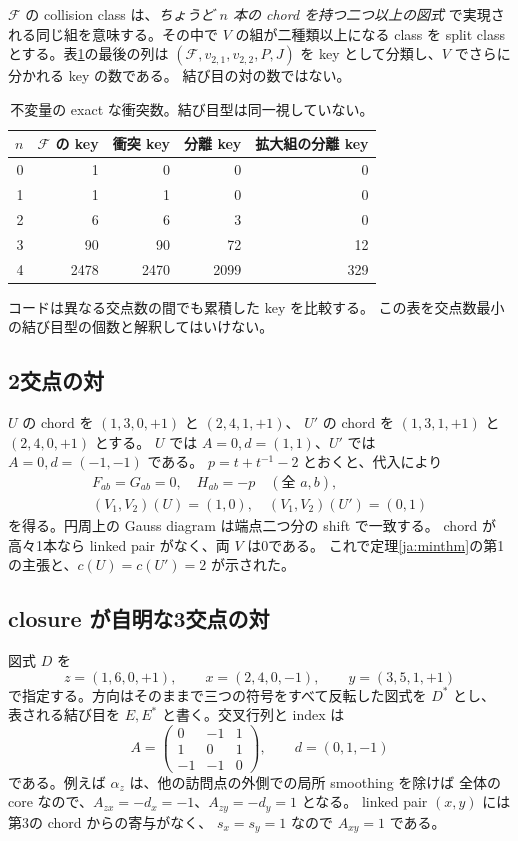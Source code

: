 \documentclass[12pt]{amsart}
\theoremstyle{definition}
\theoremstyle{remark}
\numberwithin{equation}{section}
\newcommand{\Package}{\mathcal F}
\begin{document}
$\Package$ の collision class は、\emph{ちょうど $n$ 本の chord を持つ二つ以上の図式}
で実現される同じ組を意味する。その中で $V$ の組が二種類以上になる class を
split class とする。表\ref{ja:collisions}の最後の列は
$(\Package,v_{2,1},v_{2,2},P,J)$ を key として分類し、$V$ でさらに分かれる key の数である。
結び目の対の数ではない。
\begin{table}[ht]
\centering\small
\caption{不変量の exact な衝突数。結び目型は同一視していない。}\label{ja:collisions}
\begin{tabular}{r r r r r}\toprule
$n$&$\Package$ の key&衝突 key&分離 key&拡大組の分離 key\\\midrule
0&1&0&0&0\\1&1&1&0&0\\2&6&6&3&0\\
3&90&90&72&12\\4&2478&2470&2099&329\\\bottomrule
\end{tabular}
\end{table}
コードは異なる交点数の間でも累積した key を比較する。
この表を交点数最小の結び目型の個数と解釈してはいけない。

\subsection{2交点の対}
$U$ の chord を $(1,3,0,+1)$ と $(2,4,1,+1)$、
$U'$ の chord を $(1,3,1,+1)$ と $(2,4,0,+1)$ とする。
$U$ では $A=0,d=(1,1)$、$U'$ では $A=0,d=(-1,-1)$ である。
$p=t+t^{-1}-2$ とおくと、代入により
\begin{equation}\label{ja:two}
\begin{gathered}
F_{ab}=G_{ab}=0,\quad H_{ab}=-p\quad(\text{全 }a,b),\\
(V_1,V_2)(U)=(1,0),\quad(V_1,V_2)(U')=(0,1)
\end{gathered}
\end{equation}
を得る。円周上の Gauss diagram は端点二つ分の shift で一致する。
chord が高々1本なら linked pair がなく、両 $V$ は0である。
これで定理\ref{ja:minthm}の第1の主張と、$c(U)=c(U')=2$ が示された。

\subsection{closure が自明な3交点の対}
図式 $D$ を
\begin{equation}\label{ja:seed}
z=(1,6,0,+1),\qquad x=(2,4,0,-1),\qquad y=(3,5,1,+1)
\end{equation}
で指定する。方向はそのままで三つの符号をすべて反転した図式を $D^*$ とし、
表される結び目を $E,E^*$ と書く。交叉行列と index は
\begin{equation}\label{ja:seedmatrix}
A=\begin{pmatrix}0&-1&1\\1&0&1\\-1&-1&0\end{pmatrix},\qquad d=(0,1,-1)
\end{equation}
である。例えば $\alpha_z$ は、他の訪問点の外側での局所 smoothing を除けば
全体の core なので、$A_{zx}=-d_x=-1$、$A_{zy}=-d_y=1$ となる。
linked pair $(x,y)$ には第3の chord からの寄与がなく、
$s_x=s_y=1$ なので $A_{xy}=1$ である。
\end{document}
